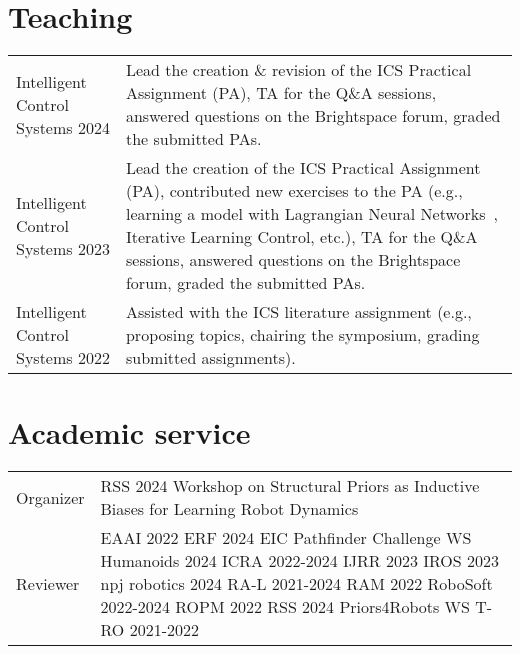 \section*{Teaching}
\noindent
\begin{longtable}{p{} p{}}
    Intelligent Control \newline Systems 2024 & Lead the creation \& revision of the ICS Practical Assignment (PA), TA for the Q\&A sessions, answered questions on the Brightspace forum, graded the submitted PAs.\\
    Intelligent Control \newline Systems 2023 & Lead the creation of the ICS Practical Assignment (PA), contributed new exercises to the PA (e.g., learning a model with Lagrangian Neural Networks~\cite{lutter2019deep}, Iterative Learning Control, etc.), TA for the Q\&A sessions, answered questions on the Brightspace forum, graded the submitted PAs.\\
    Intelligent Control \newline Systems 2022 & Assisted with the ICS literature assignment (e.g., proposing topics, chairing the symposium, grading submitted assignments).\\
\end{longtable}

\section*{Academic service}
\noindent
\begin{longtable}{p{} p{}}
    Organizer & RSS 2024 Workshop on Structural Priors as Inductive Biases for Learning Robot Dynamics\\
    Reviewer & 
        EAAI 2022 \newline
        ERF 2024 EIC Pathfinder Challenge WS \newline
        Humanoids 2024 \newline
        ICRA 2022-2024 \newline 
        IJRR 2023 \newline
        IROS 2023 \newline
        npj robotics 2024 \newline
        RA-L 2021-2024 \newline
        RAM 2022 \newline
        RoboSoft 2022-2024 \newline
        ROPM 2022 \newline
        RSS 2024 Priors4Robots WS \newline
        T-RO 2021-2022
    \\
\end{longtable}